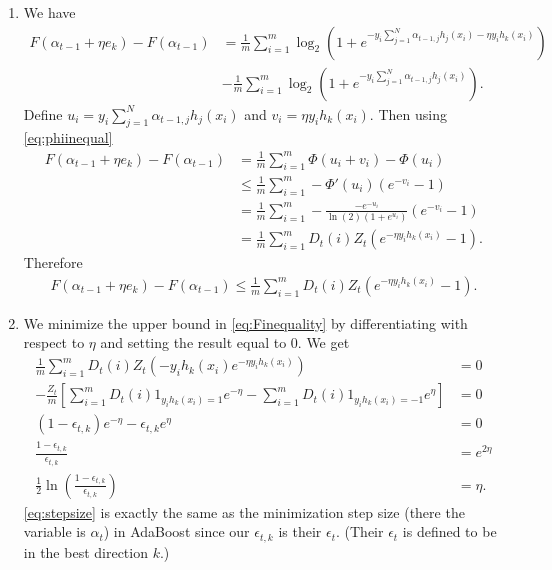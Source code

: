 \begin{enumerate}
\begin{enumerate}
    \item
    We have
    \begin{align}
        F(\alpha_{t-1} + \eta e_k) - F(\alpha_{t-1})
        &= \frac{1}{m} \sum_{i=1}^m \log_2
        (1+e^{-y_i \sum_{j=1}^N \alpha_{t-1, j} h_j(x_i)
        -\eta y_i h_k(x_i)})
        \nonumber \\
        &- \frac{1}{m} \sum_{i=1}^m \log_2
        (1+e^{-y_i \sum_{j=1}^N \alpha_{t-1, j} h_j(x_i)})
        \nonumber.
    \end{align}
    Define $u_i = y_i \sum_{j=1}^N \alpha_{t-1, j} h_j(x_i)$
    and $v_i = \eta y_i h_k(x_i)$.
    Then using \autoref{eq:phiinequal}
    \begin{align}
        F(\alpha_{t-1} + \eta e_k) - F(\alpha_{t-1})
        &= \frac{1}{m} \sum_{i=1}^m
        \Phi(u_i + v_i) - \Phi(u_i) \nonumber \\
        &\leq \frac{1}{m} \sum_{i=1}^m
        - \Phi'(u_i) (e^{-v_i}-1) \nonumber \\
        &= \frac{1}{m} \sum_{i=1}^m
        -\frac{-e^{-u_i}}{\ln(2)(1+e^{u_i})}
        (e^{-v_i}-1) \nonumber \\
        &= \frac{1}{m} \sum_{i=1}^m
        D_t(i) Z_t (e^{-\eta y_i h_k(x_i)}-1).
        \nonumber
    \end{align}
    Therefore
    \begin{align}\label{eq:Finequality}
        F(\alpha_{t-1} + \eta e_k) - F(\alpha_{t-1})
        \leq \frac{1}{m} \sum_{i=1}^m
        D_t(i) Z_t (e^{-\eta y_i h_k(x_i)}-1).
    \end{align}

    \item
    We minimize the upper bound in \autoref{eq:Finequality}
    by differentiating with respect to $\eta$ and
    setting the result equal to 0.
    We get
    \begin{align}
        \frac{1}{m} \sum_{i=1}^m D_t(i)Z_t
        (-y_i h_k(x_i) e^{-\eta y_i h_k(x_i)}) &= 0
        \nonumber \\
        -\frac{Z_t}{m} \left[
        \sum_{i=1}^m D_t(i) 1_{y_i h_k(x_i) = 1} e^{-\eta}
        - \sum_{i=1}^m D_t(i) 1_{y_i h_k(x_i) = -1} e^{\eta}
        \right] &= 0 \nonumber \\
        (1-\epsilon_{t,k})e^{-\eta} - \epsilon_{t,k} e^\eta &= 0
        \nonumber \\
        \frac{1-\epsilon_{t,k}}{\epsilon_{t,k}} &= e^{2\eta}
        \nonumber \\
        \frac{1}{2} \ln \left(
        \frac{1-\epsilon_{t,k}}{\epsilon_{t,k}} \right)
        &= \eta.
        \label{eq:stepsize}
    \end{align}
    \autoref{eq:stepsize} is exactly the same as the minimization
    step size (there the variable is $\alpha_t$) in AdaBoost
    since our $\epsilon_{t,k}$ is their $\epsilon_t$.
    (Their $\epsilon_t$ is defined to be in the best direction $k$.)


\end{enumerate}
\end{enumerate}
